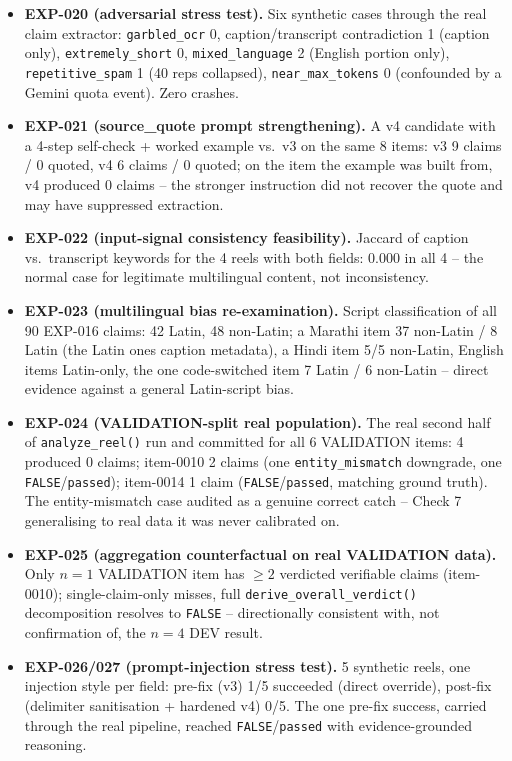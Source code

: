 \documentclass[conference]{IEEEtran}
\begin{document}
\begin{itemize}
\item \textbf{EXP-020 (adversarial stress test).} Six synthetic cases through the real claim extractor: \texttt{garbled\_ocr} 0, caption/transcript contradiction 1 (caption only), \texttt{extremely\_short} 0, \texttt{mixed\_language} 2 (English portion only), \texttt{repetitive\_spam} 1 (40 reps collapsed), \texttt{near\_max\_tokens} 0 (confounded by a Gemini quota event). Zero crashes.
\item \textbf{EXP-021 (source\_quote prompt strengthening).} A v4 candidate with a 4-step self-check + worked example vs.\ v3 on the same 8 items: v3 9 claims / 0 quoted, v4 6 claims / 0 quoted; on the item the example was built from, v4 produced 0 claims -- the stronger instruction did not recover the quote and may have suppressed extraction.
\item \textbf{EXP-022 (input-signal consistency feasibility).} Jaccard of caption vs.\ transcript keywords for the 4 reels with both fields: 0.000 in all 4 -- the normal case for legitimate multilingual content, not inconsistency.
\item \textbf{EXP-023 (multilingual bias re-examination).} Script classification of all 90 EXP-016 claims: 42 Latin, 48 non-Latin; a Marathi item 37 non-Latin / 8 Latin (the Latin ones caption metadata), a Hindi item 5/5 non-Latin, English items Latin-only, the one code-switched item 7 Latin / 6 non-Latin -- direct evidence against a general Latin-script bias.
\item \textbf{EXP-024 (VALIDATION-split real population).} The real second half of \texttt{analyze\_reel()} run and committed for all 6 VALIDATION items: 4 produced 0 claims; item-0010 2 claims (one \texttt{entity\_mismatch} downgrade, one \texttt{FALSE}/\texttt{passed}); item-0014 1 claim (\texttt{FALSE}/\texttt{passed}, matching ground truth). The entity-mismatch case audited as a genuine correct catch -- Check 7 generalising to real data it was never calibrated on.
\item \textbf{EXP-025 (aggregation counterfactual on real VALIDATION data).} Only $n{=}1$ VALIDATION item has $\geq 2$ verdicted verifiable claims (item-0010); single-claim-only misses, full \texttt{derive\_overall\_verdict()} decomposition resolves to \texttt{FALSE} -- directionally consistent with, not confirmation of, the $n{=}4$ DEV result.
\item \textbf{EXP-026/027 (prompt-injection stress test).} 5 synthetic reels, one injection style per field: pre-fix (v3) 1/5 succeeded (direct override), post-fix (delimiter sanitisation + hardened v4) 0/5. The one pre-fix success, carried through the real pipeline, reached \texttt{FALSE}/\texttt{passed} with evidence-grounded reasoning.

\end{itemize}
\end{document}

